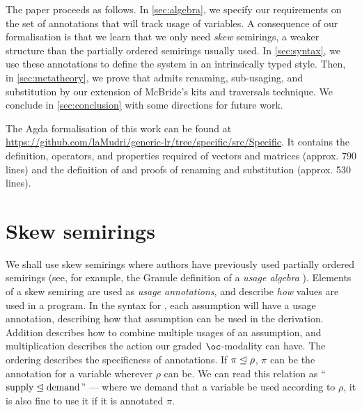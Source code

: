 \documentclass[submission,copyright,creativecommons]{eptcs}
\begin{document}


The paper proceeds as follows.
In \autoref{sec:algebra}, we specify our requirements on the set of annotations
that will track usage of variables. A consequence of our formalisation is that we learn that we only need \emph{skew} semirings, a weaker structure than the partially ordered semirings usually used.
In \autoref{sec:syntax}, we use these annotations to define the system
\name{} in an intrinsically typed style.
Then, in \autoref{sec:metatheory}, we prove that \name{} admits renaming, sub-usaging, and
substitution by our extension of McBride's kits and traversals technique.
We conclude in \autoref{sec:conclusion} with some directions for future work.

The Agda formalisation of this work can be found at
\url{https://github.com/laMudri/generic-lr/tree/specific/src/Specific}.
It contains the definition, operators, and properties required of vectors and
matrices (approx. 790 lines) and the definition of \name{} and proofs of
renaming and substitution (approx. 530 lines).

\section{Skew semirings}\label{sec:algebra}

We shall use skew semirings where authors have previously used partially ordered
semirings (see, for example, the Granule definition of a \emph{usage algebra} \cite{Granule18}).
Elements of a skew semiring are used as \emph{usage annotations}, and describe
\emph{how} values are used in a program.
In the syntax for \name{}, each assumption will have a usage annotation,
describing how that assumption can be used in the derivation.
Addition describes how to combine multiple usages of an assumption, and
multiplication describes the action our graded $\oc$-modality can have.
The ordering describes the specificness of annotations.
If $\pi \trianglelefteq \rho$, $\pi$ can be the annotation for a variable wherever
$\rho$ can be.
We can read this relation as ``$\textrm{supply} \trianglelefteq \textrm{demand}$'' ---
where we demand that a variable be used according to $\rho$, it is also fine to
use it if it is annotated $\pi$.
\end{document}
